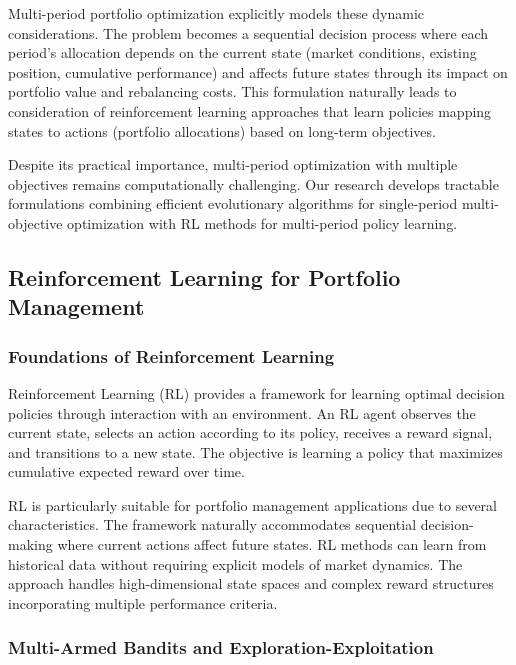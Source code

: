 \documentclass[
  10pt,
  a4paper,
]{article}
\begin{document}
Multi-period portfolio optimization explicitly models these dynamic
considerations. The problem becomes a sequential decision process where
each period's allocation depends on the current state (market
conditions, existing position, cumulative performance) and affects
future states through its impact on portfolio value and rebalancing
costs. This formulation naturally leads to consideration of
reinforcement learning approaches that learn policies mapping states to
actions (portfolio allocations) based on long-term objectives.

Despite its practical importance, multi-period optimization with
multiple objectives remains computationally challenging. Our research
develops tractable formulations combining efficient evolutionary
algorithms for single-period multi-objective optimization with RL
methods for multi-period policy learning.

\subsection{Reinforcement Learning for Portfolio
Management}\label{reinforcement-learning-for-portfolio-management}

\subsubsection{Foundations of Reinforcement
Learning}\label{foundations-of-reinforcement-learning}

Reinforcement Learning (RL) provides a framework for learning optimal
decision policies through interaction with an environment. An RL agent
observes the current state, selects an action according to its policy,
receives a reward signal, and transitions to a new state. The objective
is learning a policy that maximizes cumulative expected reward over
time.

RL is particularly suitable for portfolio management applications due to
several characteristics. The framework naturally accommodates sequential
decision-making where current actions affect future states. RL methods
can learn from historical data without requiring explicit models of
market dynamics. The approach handles high-dimensional state spaces and
complex reward structures incorporating multiple performance criteria.

\subsubsection{Multi-Armed Bandits and
Exploration-Exploitation}\label{multi-armed-bandits-and-exploration-exploitation}
\end{document}
